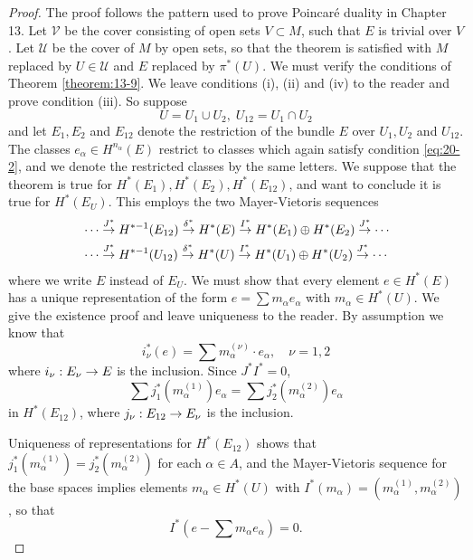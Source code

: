 \begin{proof}
  The proof follows the pattern used to prove Poincaré duality in Chapter 13. Let $\mathcal{V}$ be the cover 
  consisting of open sets $V \subset  M$, such that $E$ is trivial over $V$. Let $\mathcal{U}$ be the 
  cover of $M$ by open sets, so that the theorem is satisfied with $M$ replaced by $U \in  \mathcal{U}$ and $E$ 
  replaced by ${\pi }^*( U)$. We must verify the conditions of Theorem \ref{theorem:13-9}. We leave conditions (i), (ii) 
  and (iv) to the reader and prove condition (iii). So suppose
  \[
    U = {U}_{1} \cup  {U}_{2},\;{U}_{12} = {U}_{1} \cap  {U}_{2}
  \]
  and let ${E}_{1},{E}_{2}$ and $E_{12}$ denote the restriction of the bundle $E$ over ${U}_{1},{U}_{2}$ 
  and ${U}_{12}$. The classes ${e}_{\alpha } \in  H^{{n}_{\alpha }}( E)$ restrict to classes which again 
  satisfy condition \eqref{eq:20-2}, and we denote the restricted classes by the same letters. We suppose that the theorem 
  is true for $H^*( {E}_{1}),H^*( {E}_{2}),H^*( E_{12})$, and want to conclude it is 
  true for $H^*( {E}_{U})$. This employs the two Mayer-Vietoris sequences
  \begin{align*}
    & \cdots \overset{{J}^*}
      { \rightarrow  }H^{*- 1}( E_{12}) \overset{{\delta }^*}
      { \rightarrow  }H^*( E) \overset{{I}^*}
      { \rightarrow  }H^*( {E}_{1})  \oplus  H^*( {E}_{2}) \overset{{J}^*}
      { \rightarrow  }\cdots\\
    & \cdots \overset{{J}^*}
      { \rightarrow  }H^{*- 1}( {U}_{12}) \overset{{\delta }^*}
      { \rightarrow  }H^*( U) \overset{{I}^*}
      { \rightarrow  }H^*( {U}_{1})  \oplus  H^*( {U}_{2}) \overset{{J}^*}
      { \rightarrow  }\cdots
  \end{align*}
  where we write $E$ instead of ${E}_{U}$. We must show that every element $e \in  H^*( E)$ has a unique 
  representation of the form $e = \sum {m}_{\alpha }{e}_{\alpha }$ with ${m}_{\alpha } \in  H^*( U)$. 
  We give the existence proof and leave uniqueness to the reader. By assumption we know that
  \[
    {i}_{\nu }^*( e)  = \sum {m}_{\alpha }^{( \nu ) } \cdot  {e}_{\alpha },\quad\nu  = 1,2
  \]
  where ${i}_{\nu } : {E}_{\nu } \rightarrow  E$ is the inclusion. Since ${J}^*{I}^* = 0$,
  \[
    \sum {j}_{1}^*( {m}_{\alpha }^{( 1) }) {e}_{\alpha } 
    = \sum {j}_{2}^*( {m}_{\alpha }^{( 2) }) {e}_{\alpha }
  \]
  in $H^*( E_{12})$, where ${j}_{\nu } : E_{12} \rightarrow  {E}_{\nu }$ is the inclusion.

  Uniqueness of representations for $H^*(E_{12})$ shows that ${j}_{1}^*( {m}_{\alpha }^{( 1) })= {j}_{2}^*( {m}_{\alpha }^{( 2) })$ 
  for each $\alpha  \in  A$, and the Mayer-Vietoris sequence for the base spaces implies elements ${m}_{\alpha } \in  H^*( U)$ 
  with ${I}^*( {m}_{\alpha })  = ( {{m}_{\alpha }^{( 1) },{m}_{\alpha }^{( 2) }})$, so that
  \[
    {I}^*( {e- \sum {m}_{\alpha }{e}_{\alpha }})  = 0.
  \]


\end{proof}
